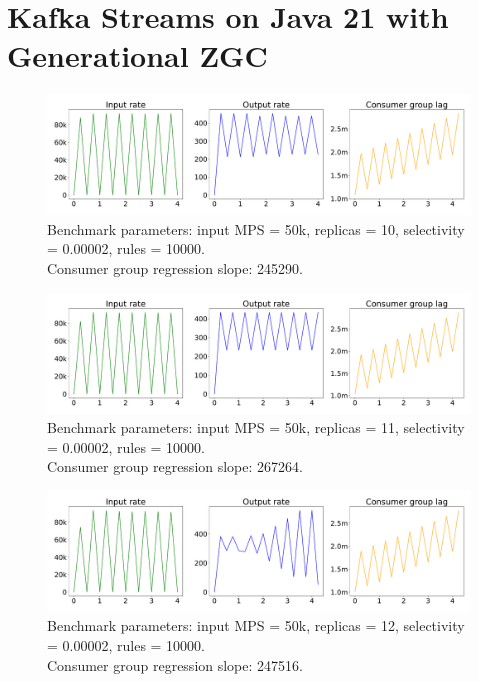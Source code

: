 \newpage

\section{Kafka Streams on Java 21 with Generational ZGC}\label{sec:kafka-streams-on-java-21-with-generational-zgc}

\begin{figure}[H]
    \centering
    \includegraphics[width=1\textwidth]{figures/k-streams-java-21-new-gc-replicas-10}
    \caption{Benchmark parameters: input MPS = 50k, replicas = 10, selectivity = 0.00002, rules = 10000. \\
    Consumer group regression slope: 245290.}
    \label{fig:k-streams-java-21-new-gc-replicas-10}
\end{figure}


\begin{figure}[H]
    \centering
    \includegraphics[width=1\textwidth]{figures/k-streams-java-21-new-gc-replicas-11}
    \caption{Benchmark parameters: input MPS = 50k, replicas = 11, selectivity = 0.00002, rules = 10000. \\
    Consumer group regression slope: 267264.}
    \label{fig:k-streams-java-21-new-gc-replicas-11}
\end{figure}

\begin{figure}[H]
    \centering
    \includegraphics[width=1\textwidth]{figures/k-streams-java-21-new-gc-replicas-12}
    \caption{Benchmark parameters: input MPS = 50k, replicas = 12, selectivity = 0.00002, rules = 10000. \\
    Consumer group regression slope: 247516.}
    \label{fig:k-streams-java-21-new-gc-replicas-12}
\end{figure}


